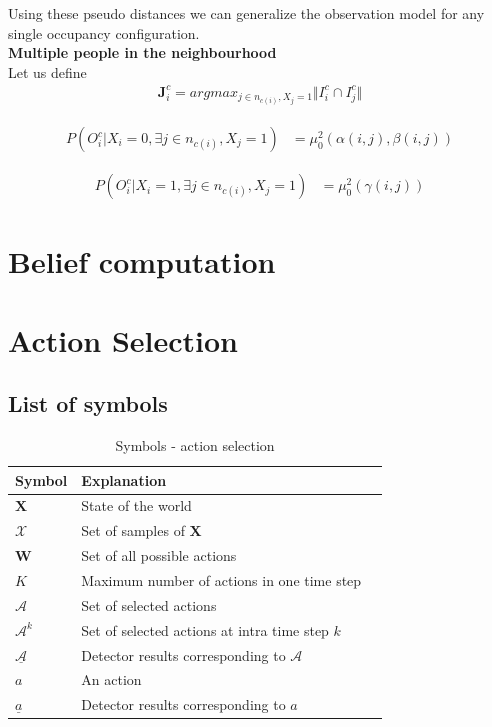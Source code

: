 \documentclass[10pt,twocolumn,letterpaper]{article}
\begin{document}
 Using these pseudo distances we can generalize the observation model for any single occupancy configuration.\\

\textbf{Multiple people in the neighbourhood}\\
Let us define 
\begin{align}
 \textbf{J}_{i}^{c} = argmax_{j\in n_{c(i)},X_{j}=1} \Vert I_{i}^{c}\cap I_{j}^{c} \Vert  
\end{align}

\begin{align}
 P(O^{c}_{i} |X_{i}=0 ,\exists j  \in{n_{c(i)}},X_{j} =1)  &=\mu^{2}_{0}(     \alpha(i,j),\beta(i,j))
\end{align}

\begin{align}
 P(O^{c}_{i} |X_{i}=1 ,\exists j \in{n_{c(i)}},X_{j} =1)  &=\mu^{2}_{0}(  \gamma(i,j))
\end{align}


\section{Belief computation}

\section{Action Selection}

\subsection{List of symbols}
\begin{table}[ht]
  \begin{tabular}{lll}
   \hline
   Symbol & Explanation \\
   \hline
$\textbf{X} $ & State of the world\\
 $\mathcal{X} $ & Set of samples of $\textbf{X}$ \\
 $\textbf{W} $ & Set of all possible actions\\
 $K$ & Maximum number of actions in one time step\\
 $\mathcal{A} $ & Set of selected actions\\
 $\mathcal{A}^{k} $ & Set of selected actions at intra time step $k$\\
 $\underline{\mathcal{A}} $ & Detector results corresponding to $\mathcal{A}$\\
 $a $ & An action\\
 $ \underline{a} $ & Detector results corresponding to $ a$\\
   \hline
  \end{tabular}
  \caption{
    Symbols - action selection
  }
  \label{tab:Symbols in action selection}
\end{table}
\end{document}
